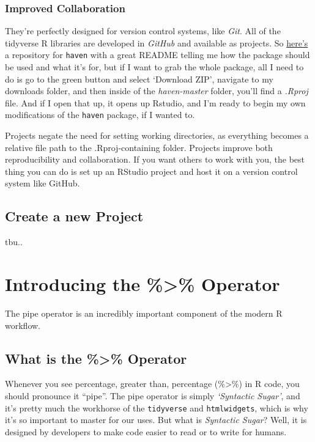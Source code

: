 \documentclass[
]{article}
\begin{document}
\hypertarget{improved-collaboration}{%
\subsubsection{Improved Collaboration}\label{improved-collaboration}}

They're perfectly designed for version control systems, like \emph{Git}. All of the tidyverse R libraries are developed in \emph{GitHub} and available as projects. So \href{https://github.com/tidyverse/haven}{here's} a repository for \texttt{haven} with a great README telling me how the package should be used and what it's for, but if I want to grab the whole package, all I need to do is go to the green button and select `Download ZIP', navigate to my downloads folder, and then inside of the \emph{haven-master} folder, you'll find a \emph{.Rproj} file. And if I open that up, it opens up Rstudio, and I'm ready to begin my own modifications of the \texttt{haven} package, if I wanted to.

Projects negate the need for setting working directories, as everything becomes a relative file path to the .Rproj-containing folder. Projects improve both reproducibility and collaboration. If you want others to work with you, the best thing you can do is set up an RStudio project and host it on a version control system like GitHub.

\hypertarget{create-a-new-project}{%
\subsection{Create a new Project}\label{create-a-new-project}}

tbu..

\hypertarget{introducing-the-operator}{%
\section{Introducing the \%\textgreater\% Operator}\label{introducing-the-operator}}

The pipe operator is an incredibly important component of the modern R workflow.

\hypertarget{what-is-the-operator}{%
\subsection{What is the \%\textgreater\% Operator}\label{what-is-the-operator}}

Whenever you see percentage, greater than, percentage (\%\textgreater\%) in R code, you should pronounce it ``pipe''. The pipe operator is simply \emph{`Syntactic Sugar'}, and it's pretty much the workhorse of the \texttt{tidyverse} and \texttt{htmlwidgets}, which is why it's so important to master for our uses. But what is \emph{Syntactic Sugar}? Well, it is designed by developers to make code easier to read or to write for humans.
\end{document}
